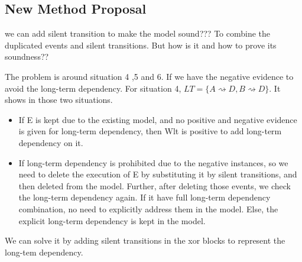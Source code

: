 \documentclass[]{article}
\begin{document}
\subsection{New Method Proposal}
we can add silent transition to make the model sound??? To combine the duplicated events and silent transitions. But how is it and how to prove its soundness?? 

The problem is around situation 4 ,5 and 6. If we have the negative evidence to avoid the long-term dependency. 
For situation 4, $LT=\{ A\rightsquigarrow D, B\rightsquigarrow D\}$. It shows in those two situations. 
\begin{itemize}
	\item If E is kept due to the existing model, and no positive and negative evidence is given for long-term dependency, then Wlt is positive to add long-term dependency on it. 
	\item If long-term dependency is prohibited due to the negative instances, so we need to delete the execution of E by substituting it by silent transitions, and then deleted from the model. Further, after deleting those events, we check the long-term dependency again. If it have full long-term dependency combination, no need to explicitly address them in the model. Else, the explicit long-term dependency is kept in the model. 
\end{itemize}
We can solve it by adding silent transitions in the xor blocks to represent the long-tem dependency. 
\end{document}
